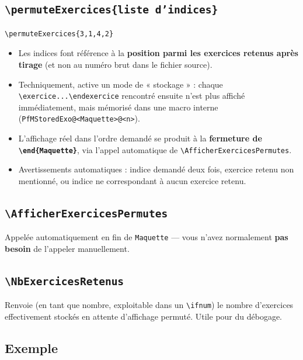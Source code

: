 \documentclass[11pt,a4paper]{article}
\newcommand{\cmdname}[1]{\texttt{\textbackslash#1}}
\begin{document}
\subsection{\cmdname{permuteExercices\{liste d'indices\}}}

\begin{lstlisting}
\permuteExercices{3,1,4,2}
\end{lstlisting}

\begin{itemize}
  \item Les indices font référence à la \textbf{position parmi les exercices retenus après tirage} (et non au numéro brut dans le fichier source).
  \item Techniquement, active un mode de « stockage » : chaque \texttt{\textbackslash exercice...\textbackslash endexercice} rencontré ensuite n'est plus affiché immédiatement, mais mémorisé dans une macro interne (\texttt{PfMStoredExo@<Maquette>@<n>}).
  \item L'affichage réel dans l'ordre demandé se produit à la \textbf{fermeture de \texttt{\textbackslash end\{Maquette\}}}, via l'appel automatique de \cmdname{AfficherExercicesPermutes}.
  \item Avertissements automatiques : indice demandé deux fois, exercice retenu non mentionné, ou indice ne correspondant à aucun exercice retenu.
\end{itemize}

\subsection{\cmdname{AfficherExercicesPermutes}}

Appelée automatiquement en fin de \texttt{Maquette} — vous n'avez normalement \textbf{pas besoin} de l'appeler manuellement.

\subsection{\cmdname{NbExercicesRetenus}}

Renvoie (en tant que nombre, exploitable dans un \texttt{\textbackslash ifnum}) le nombre d'exercices effectivement stockés en attente d'affichage permuté. Utile pour du débogage.

\subsection{Exemple}
\end{document}
